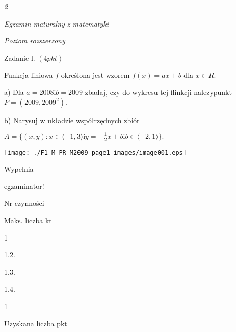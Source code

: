 \documentclass[a4paper,12pt]{article}
\begin{document}
{\it 2}

{\it Egzamin maturalny z matematyki}

{\it Poziom rozszerzony}

Zadanie l. $(4pkt)$

Funkcja liniowa $f$ określona jest wzorem $f(x)=ax+b$ dla $x\in R.$

a) Dla $a=2008\mathrm{i}b=2009$ zbadaj, czy do wykresu tej ffinkcji nalezypunkt $P=(2009,2009^{2}).$

b) Narysuj w układzie współrzędnych zbiór

$A=\displaystyle \{(x,y):x\in\langle-1,3\rangle\mathrm{i}y=-\frac{1}{2}x+b\mathrm{i}b\in\langle-2,1\rangle\}.$
\begin{center}
\texttt{[image: ./F1\_M\_PR\_M2009\_page1\_images/image001.eps]}
\end{center}
Wypelnia

egzaminator!

Nr czynności

Maks. liczba kt

1

1.2.

1.3.

1.4.

1

Uzyskana liczba pkt
\end{document}
